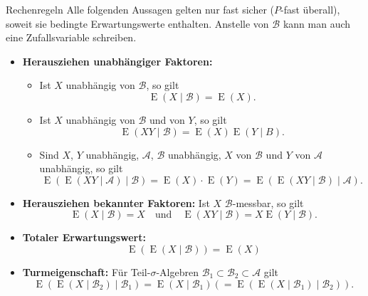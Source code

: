 \begin{defi}{Rechenregeln}
    Alle folgenden Aussagen gelten nur fast sicher ($P$-fast überall), soweit sie bedingte Erwartungswerte enthalten.
    Anstelle von $\mathcal{B}$ kann man auch eine Zufallsvariable schreiben.

    \begin{itemize}
        \item \textbf{Herausziehen unabhängiger Faktoren:}
              \begin{itemize}
                  \item Ist $X$ unabhängig von $\mathcal{B}$, so gilt
                        \[
                            \operatorname{E} (X\mid{\mathcal{B}})=\operatorname{E}(X).
                        \]
                  \item Ist $X$ unabhängig von $\mathcal{B}$ und von $Y$, so gilt
                        \[
                            \operatorname{E} (XY\mid{\mathcal{B}})=\operatorname{E}(X)\operatorname{E}(Y\mid B).
                        \]
                  \item Sind $X$, $Y$ unabhängig, $\mathcal{A}$, $\mathcal{B}$ unabhängig, $X$ von $\mathcal{B}$ und $Y$ von $\mathcal{A}$ unabhängig, so gilt
                        \[
                            \operatorname{E} (\operatorname{E} (XY\mid{\mathcal{A}})\mid{\mathcal{B}}) = \operatorname{E} (X) \cdot \operatorname{E}(Y) = \operatorname{E} (\operatorname{E} (XY\mid{\mathcal{B}})\mid{\mathcal{A}}).
                        \]
              \end{itemize}
        \item \textbf{Herausziehen bekannter Faktoren:}
              Ist $X$ $\mathcal{B}$-messbar, so gilt
              \[
                  \operatorname{E} (X \mid{\mathcal{B}}) = X \quad \text{und} \quad \operatorname{E} (XY \mid{\mathcal{B}}) = X \operatorname{E} (Y \mid{\mathcal{B}}).
              \]
        \item \textbf{Totaler Erwartungswert:}
              \[
                  \operatorname{E} (\operatorname{E} (X\mid{\mathcal{B}})) = \operatorname{E} (X)
              \]
        \item \textbf{Turmeigenschaft:}
              Für Teil-$\sigma$-Algebren $\mathcal{B}_{1}\subset{\mathcal{B}}_{2}\subset{\mathcal{A}}$ gilt
              \[
                  \operatorname{E} (\operatorname{E} (X\mid{\mathcal{B}}_{2})\mid{\mathcal{B}}_{1})=\operatorname{E} (X\mid{\mathcal{B}}_{1})(=\operatorname{E} (\operatorname{E} (X\mid{\mathcal{B}}_{1})\mid{\mathcal{B}}_{2})).
\]
\end{itemize}
\end{defi}
